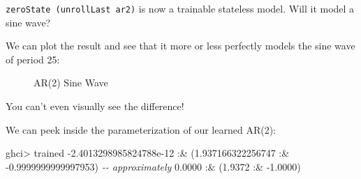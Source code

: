 \documentclass[]{article}
\newenvironment{Shaded}{}{}
\newcommand{\CommentTok}[1]{\textcolor[rgb]{0.38,0.63,0.69}{\textit{#1}}}
\newcommand{\DataTypeTok}[1]{\textcolor[rgb]{0.56,0.13,0.00}{#1}}
\newcommand{\DecValTok}[1]{\textcolor[rgb]{0.25,0.63,0.44}{#1}}
\newcommand{\FloatTok}[1]{\textcolor[rgb]{0.25,0.63,0.44}{#1}}
\newcommand{\FunctionTok}[1]{\textcolor[rgb]{0.02,0.16,0.49}{#1}}
\newcommand{\KeywordTok}[1]{\textcolor[rgb]{0.00,0.44,0.13}{\textbf{#1}}}
\newcommand{\NormalTok}[1]{#1}
\newcommand{\OperatorTok}[1]{\textcolor[rgb]{0.40,0.40,0.40}{#1}}
\newcommand{\OtherTok}[1]{\textcolor[rgb]{0.00,0.44,0.13}{#1}}
\begin{document}
\texttt{zeroState\ (unrollLast\ ar2)} is now a trainable stateless model. Will
it model a sine wave?

\begin{Shaded}
\end{Shaded}

We can plot the result and see that it more or less perfectly models the sine
wave of period 25:

\begin{figure}
\centering
{}
\caption{AR(2) Sine Wave}
\end{figure}

You can't even visually see the difference!

We can peek inside the parameterization of our learned AR(2):

\begin{Shaded}
\begin{Highlighting}[]
\NormalTok{ghci}\OperatorTok{\textgreater{}}\NormalTok{ trained}
\OperatorTok{{-}}\FloatTok{2.4013298985824788e{-}12} \OperatorTok{:\&}\NormalTok{ (}\FloatTok{1.937166322256747} \OperatorTok{:\&} \OperatorTok{{-}}\FloatTok{0.9999999999997953}\NormalTok{)}
\CommentTok{{-}{-} approximately}
\FloatTok{0.0000} \OperatorTok{:\&}\NormalTok{ (}\FloatTok{1.9372} \OperatorTok{:\&} \OperatorTok{{-}}\FloatTok{1.0000}\NormalTok{)}
\end{Highlighting}
\end{Shaded}
\end{document}

